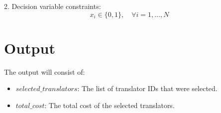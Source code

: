 \documentclass{article}
\begin{document}
2. Decision variable constraints:
\[
x_i \in \{0, 1\}, \quad \forall i = 1, \ldots, N
\]

\section*{Output}
The output will consist of:
\begin{itemize}
    \item $selected\_translators$: The list of translator IDs that were selected.
    \item $total\_cost$: The total cost of the selected translators.
\end{itemize}
\end{document}
